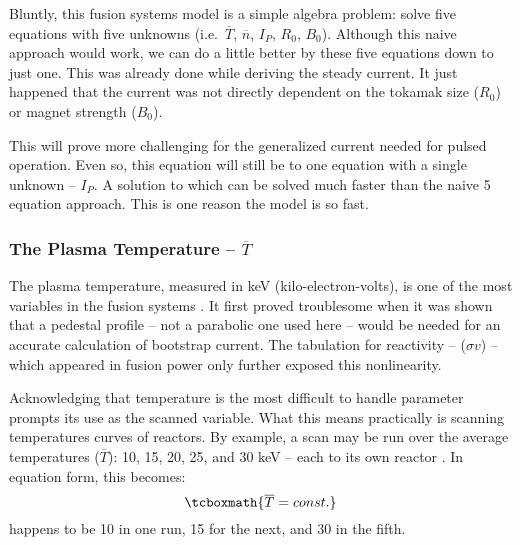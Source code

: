 Bluntly, this fusion systems model is a simple algebra problem: solve five equations with five unknowns (i.e.\ $\overline T$, $\overline n$, $I_P$, $R_0$, $B_0$). Although this naive approach would work, we can do a little better by  these five equations down to just one. This was already done while deriving the steady current. It just happened that the current was not directly dependent on the tokamak size ($R_0$) or magnet strength ($B_0$).

This will prove more challenging for the generalized current needed for pulsed operation. Even so, this equation will still be  to one equation with a single unknown -- $I_P$. A solution to which can be solved much faster than the naive 5 equation approach. This is one reason the model is so fast.

\subsubsection{The Plasma Temperature -- $\overline T$}

The plasma temperature, measured in keV (kilo-electron-volts), is one of the most  variables in the fusion systems . It first proved troublesome when it was shown that a pedestal profile -- not a parabolic one used here -- would be needed for an accurate calculation of bootstrap current. The  tabulation for reactivity -- ($\sigma v$) -- which appeared in fusion power only further exposed this nonlinearity.

Acknowledging that temperature is the most difficult to handle parameter prompts its use as the scanned variable. What this means practically is scanning temperatures  curves of reactors. By example, a scan may be run over the average temperatures ($\overline T$): 10, 15, 20, 25, and 30 keV --  each  to its own reactor . In equation form, this becomes:
\begin{equation}
	\label{eq:tbar}
	\tcboxmath{
	\overline T = const.
	}
\end{equation}
 happens to be 10  in one run, 15  for the next, and 30  in the fifth.

